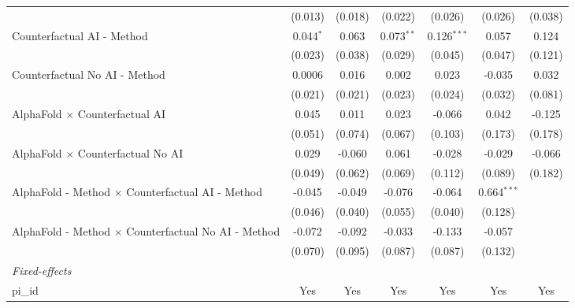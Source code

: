 \begin{tabular}{lcccccc}
                                                              & (0.013)       & (0.018)      & (0.022)      & (0.026)       & (0.026)       & (0.038)\\   
   Counterfactual AI - Method                                 & 0.044$^{*}$   & 0.063        & 0.073$^{**}$ & 0.126$^{***}$ & 0.057         & 0.124\\   
                                                              & (0.023)       & (0.038)      & (0.029)      & (0.045)       & (0.047)       & (0.121)\\   
   Counterfactual No AI - Method                              & 0.0006        & 0.016        & 0.002        & 0.023         & -0.035        & 0.032\\   
                                                              & (0.021)       & (0.021)      & (0.023)      & (0.024)       & (0.032)       & (0.081)\\   
   AlphaFold $\times$ Counterfactual AI                       & 0.045         & 0.011        & 0.023        & -0.066        & 0.042         & -0.125\\   
                                                              & (0.051)       & (0.074)      & (0.067)      & (0.103)       & (0.173)       & (0.178)\\   
   AlphaFold $\times$ Counterfactual No AI                    & 0.029         & -0.060       & 0.061        & -0.028        & -0.029        & -0.066\\   
                                                              & (0.049)       & (0.062)      & (0.069)      & (0.112)       & (0.089)       & (0.182)\\   
   AlphaFold - Method $\times$ Counterfactual AI - Method     & -0.045        & -0.049       & -0.076       & -0.064        & 0.664$^{***}$ &   \\   
                                                              & (0.046)       & (0.040)      & (0.055)      & (0.040)       & (0.128)       &   \\   
   AlphaFold - Method $\times$ Counterfactual No AI - Method  & -0.072        & -0.092       & -0.033       & -0.133        & -0.057        &   \\   
                                                              & (0.070)       & (0.095)      & (0.087)      & (0.087)       & (0.132)       &   \\   
   \midrule
   \emph{Fixed-effects}\\
   pi\_id                                                     & Yes           & Yes          & Yes          & Yes           & Yes           & Yes\\  

\end{tabular}
